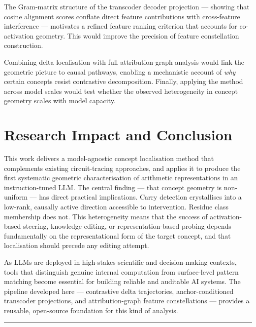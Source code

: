 \documentclass[11pt,a4paper]{article}
\begin{document}
The Gram-matrix structure of the transcoder decoder projection — showing that cosine alignment scores conflate direct feature contributions with cross-feature interference — motivates a refined feature ranking criterion that accounts for co-activation geometry. This would improve the precision of feature constellation construction.

Combining delta localisation with full attribution-graph analysis would link the geometric picture to causal pathways, enabling a mechanistic account of \emph{why} certain concepts resist contrastive decomposition. Finally, applying the method across model scales would test whether the observed heterogeneity in concept geometry scales with model capacity.

\section{Research Impact and Conclusion}

This work delivers a model-agnostic concept localisation method that complements existing circuit-tracing approaches, and applies it to produce the first systematic geometric characterisation of arithmetic representations in an instruction-tuned LLM. The central finding — that concept geometry is non-uniform — has direct practical implications. Carry detection crystallises into a low-rank, causally active direction accessible to intervention. Residue class membership does not. This heterogeneity means that the success of activation-based steering, knowledge editing, or representation-based probing depends fundamentally on the representational form of the target concept, and that localisation should precede any editing attempt.

As LLMs are deployed in high-stakes scientific and decision-making contexts, tools that distinguish genuine internal computation from surface-level pattern matching become essential for building reliable and auditable AI systems. The pipeline developed here — contrastive delta trajectories, anchor-conditioned transcoder projections, and attribution-graph feature constellations — provides a reusable, open-source foundation for this kind of analysis.

\vspace{8pt}
{\color{rulecol}\rule{\linewidth}{0.5pt}}

\begingroup
\small


\endgroup
\end{document}

